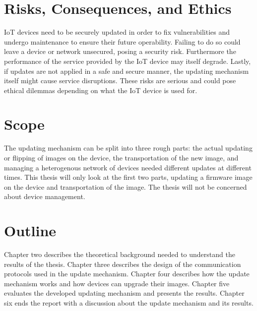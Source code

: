 \documentclass[0-thesis.tex]{subfiles}
\begin{document}
\section{Risks, Consequences, and Ethics}
IoT devices need to be securely updated in order to fix vulnerabilities and undergo maintenance to ensure 
their future operability. Failing to do so could leave a device or network unsecured, posing a security risk. 
Furthermore the performance of the service provided by the IoT device may itself degrade. Lastly, if updates 
are not applied in a safe and secure manner, the updating mechanism itself might cause service disruptions.
These risks are serious and could pose ethical dilemmas depending on what the IoT device is used for.

\section{Scope}
The updating mechanism can be split into three rough parts: the actual updating or flipping of 
images on the device, the transportation of the new image, and managing a heterogenous network
of devices needed different updates at different times. This thesis will only look at the first 
two parts, updating a firmware image on the device and transportation of the image. The thesis 
will not be concerned about device management.

\section{Outline}
Chapter two describes the theoretical background needed to understand the results of the thesis.
Chapter three describes the design of the communication protocols used in the update mechanism.
Chapter four describes how the update mechanism works and how devices can upgrade their images.
Chapter five evaluates the developed updating mechanism and presents the results.
Chapter six ends the report with a discussion about the update mechanism and its results.
\end{document}
